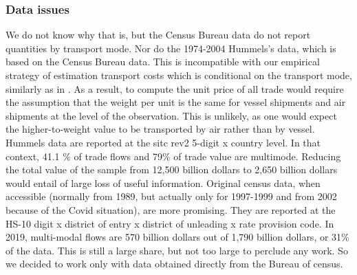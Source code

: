 \documentclass[a4paper,11pt]{article}
\begin{document}
\begin{itemize}
\begin{enumerate}
\begin{table}[htbp]

\subsubsection{Data issues}

We do not know why that is, but the Census Bureau data do not report quantities by transport mode.
Nor do the 1974-2004 Hummels’s data, which is based on the Census Bureau data. 
This is incompatible with our empirical strategy of estimation transport costs which is conditional on the transport mode, similarly as in \cite{hummels2007}.
As a result, to compute the unit price of all trade would require the assumption that the weight per unit is the same for vessel shipments and air shipments at the level of the observation.
This is unlikely, as one would expect the higher-to-weight value to be transported by air rather than by vessel.
Hummels data are reported at the  sitc rev2 5-digit x  country level. In that context, 41.1 \% of trade flows and 79\% of trade value are multimode.
Reducing the total value of the sample from 12,500 billion dollars to 2,650 billion dollars would entail of large loss of useful information. 
Original census data, when accessible (normally from 1989, but actually only for 1997-1999 and from 2002 because of the Covid situation), are more promising.
They are reported at the HS-10 digit x district of entry x district of unleading x rate provision code.
In 2019, multi-modal flows are 570 billion dollars out of 1,790 billion dollars, or 31\% of the data.
This is still a large share, but not too large to perclude any work. 
So we decided to work only with data obtained directly from the Bureau of census. 



\end{table}
\end{enumerate}
\end{itemize}
\end{document}
